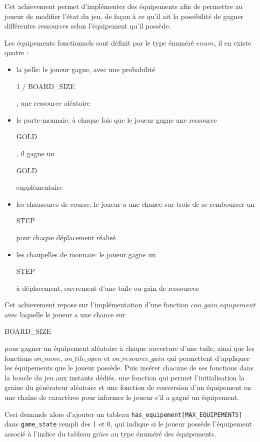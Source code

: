 
Cet achievement permet d'implémenter des équipements afin de permettre au joueur de modifier l'état du jeu, de façon à ce qu'il ait la possibilité de gagner différentes ressources selon l'équipement qu'il possède.

Les équipements fonctionnels sont définit par le type énuméré $enum$, il en existe quatre :
\begin{itemize}
    \item la pelle: le joueur gagne, avec une probabilité \begin{scriptsize} 1 / BOARD\_SIZE \end{scriptsize}, une ressource aléatoire 
    \item le porte-monnaie: à chaque fois que le joueur gagne une ressource \begin{scriptsize}GOLD\end{scriptsize}, il gagne un \begin{scriptsize} GOLD \end{scriptsize} supplémentaire
    \item les chaussures de course: le joueur a une chance sur trois de se rembourser un\begin{scriptsize} STEP \end{scriptsize} pour chaque déplacement réalisé
    \item les chaupelles de monnaie: le joueur gagne un \begin{scriptsize}STEP\end{scriptsize} à déplacement, ouvrement d'une tuile ou gain de ressources
\end{itemize}

Cet achievement repose sur l'implémentation d'une fonction $can\_gain\_equipement$ avec laquelle le joueur a une chance sur \begin{scriptsize}BOARD\_SIZE
\end{scriptsize} pour gagner un équipement aléatoire à chaque ouverture d'une tuile, ainsi que les fonctions $on\_move$, $on\_tile\_open$ et $on\_resource\_gain$ qui permettent d'appliquer les équipements que le joueur possède. Puis insérer chacune de ses fonctions dans la boucle du jeu aux instants dédiés. une fonction qui permet l'initialisation la graine du générateur aléatoire et une fonction de conversion d'un équipement en une chaîne de caractères pour informer le joueur s'il a gagné un équipement.

Ceci demande alors d'ajouter un tableau \texttt{has\_equipement[MAX\_EQUIPEMENTS]} dans \texttt{game\_state} rempli des 1 et 0, qui indique si le joueur possède l'équipement associé à l'indice du tableau grâce au type énuméré des équipements.